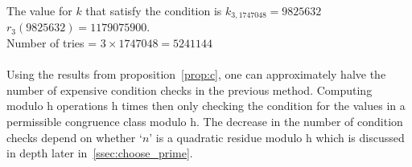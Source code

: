 \documentclass{article}
\begin{document}
{The value for $k$ that satisfy the condition is $k_{3,1747048} = 9825632$\\
$r_3(9825632) = 1179075900$.\\
Number of tries  = $3 \times 1747048 = 5241144$\\
~\\
Using the results from proposition~\ref{prop:c}, one can approximately halve the number of expensive condition checks in the previous method. Computing modulo h operations h times then only checking the condition for the values in a permissible congruence class modulo h. The decrease in the number of condition checks depend on whether `$n$' is a quadratic residue modulo h which is discussed in depth later in~\ref{ssec:choose_prime}.
}
\end{document}
